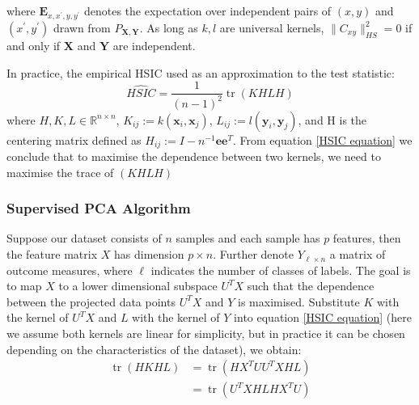 \documentclass[a4paper,12pt]{article}
\begin{document}
where $\mathbf{E}_{x, x^{\prime}, y, y^{\prime}}$ denotes the expectation over independent pairs of $(x, y)$ and $\left(x^{\prime}, y^{\prime}\right)$ drawn from $P_{\boldsymbol{X}, \boldsymbol{Y}}$. As long as $k,l$ are universal kernels, $\|C_{x y}\|_{H S}^{2} = 0$ if and only if $\boldsymbol{X}$ and $\boldsymbol{Y}$ are independent.

In practice, the empirical HSIC used as an approximation to the test statistic:
\begin{equation} \label{HSIC equation}
\widehat{HSIC}=\frac{1}{(n-1)^{2}} \operatorname{tr}(KHLH)
\end{equation} 
where $H, K, L \in \mathbb{R}^{n \times n}$, $K_{i j}:=k\left(\mathbf{x}_{i}, \mathbf{x}_{j}\right)$, $L_{i j}:=l\left(\mathbf{y}_{i}, \mathbf{y}_{j}\right)$, and H is the centering matrix defined as $H_{i j}:=I - n^{-1} \mathbf{e} \mathbf{e}^{T}$. From equation \ref{HSIC equation} we conclude that to maximise the dependence between two kernels, we need to maximise the trace of $(K H L H)$

\subsubsection{Supervised PCA Algorithm} 
Suppose our dataset consists of $n$ samples and each sample has $p$ features, then the feature matrix $X$ has dimension $p \times n$. Further denote $Y_{\ell \times n}$ a matrix of outcome measures, where $\ell$ indicates the number of classes of labels. The goal is to map $X$ to a lower dimensional subspace $U^{T}X$ such that the dependence between the projected data points $U^{T}X$ and $Y$ is maximised. Substitute $K$ with the kernel of $U^{T}X$ and $L$ with the kernel of $Y$ into equation \ref{HSIC equation} (here we assume both kernels are linear for simplicity, but in practice it can be chosen depending on the characteristics of the dataset), we obtain:
\begin{align*}
\operatorname{tr}(H K H L) & =\operatorname{tr}\left(H X^{T} U U^{T} X H L\right) \\
& =\operatorname{tr}\left(U^{T} X H L H X^{T} U\right)
\end{align*}
\end{document}
